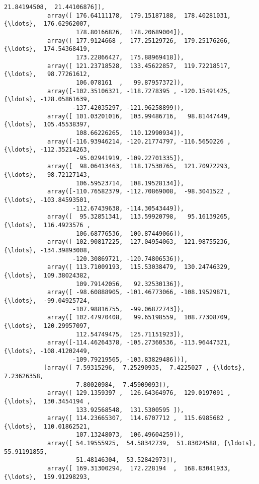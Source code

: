 \documentclass[11pt]{article}
\begin{document}
\begin{Verbatim}[commandchars=\\\{\}]
                    21.84194508,  21.44106876]),
            array([ 176.64111178,  179.15187188,  178.40281031, {\ldots},  176.62962007,
                    178.80166826,  178.20689004]),
            array([ 177.9124668 ,  177.25129726,  179.25176266, {\ldots},  174.54368419,
                    173.22866427,  175.88969418]),
            array([ 121.23718528,  133.45622857,  119.72218517, {\ldots},   98.77261612,
                    106.078161  ,   99.87957372]),
            array([-102.35106321, -118.7278395 , -120.15491425, {\ldots}, -128.05861639,
                   -137.42035297, -121.96258899]),
            array([ 101.03201016,  103.99486716,   98.81447449, {\ldots},  105.45538397,
                    108.66226265,  110.12990934]),
            array([-116.93946214, -120.21774797, -116.5650226 , {\ldots}, -112.35214263,
                    -95.02941919, -109.22701335]),
            array([  98.06413463,  118.17530765,  121.70972293, {\ldots},   98.72127143,
                    106.59523714,  108.19528134]),
            array([-110.76582379, -112.70869008,  -98.3041522 , {\ldots}, -103.84593501,
                   -112.67439638, -114.30543449]),
            array([  95.32851341,  113.59920798,   95.16139265, {\ldots},  116.4923576 ,
                    106.68776536,  100.87449066]),
            array([-102.90817225, -127.04954063, -121.98755236, {\ldots}, -134.39893008,
                   -120.30869721, -120.74806536]),
            array([ 113.71009193,  115.53038479,  130.24746329, {\ldots},  109.38024382,
                    109.79142056,   92.32530136]),
            array([ -98.60888905, -101.46773066, -108.19529871, {\ldots},  -99.04925724,
                   -107.98816755,  -99.06872743]),
            array([ 102.47970408,   99.65198559,  108.77308709, {\ldots},  120.29957097,
                    112.54749475,  125.71151923]),
            array([-114.46264378, -105.27360536, -113.96447321, {\ldots}, -108.41202449,
                   -109.79219565, -103.83829486])],
           [array([ 7.59315296,  7.25290935,  7.4225027 , {\ldots},  7.23626358,
                    7.80020984,  7.45909093]),
            array([ 129.1359397 ,  126.64364976,  129.0197091 , {\ldots},  130.3454194 ,
                    133.92568548,  131.5300595 ]),
            array([ 114.23665307,  114.6707712 ,  115.6985682 , {\ldots},  110.01862521,
                    107.13248073,  106.49604259]),
            array([ 54.19555925,  54.58342739,  51.83024588, {\ldots},  55.91191855,
                    51.48146304,  53.52842973]),
            array([ 169.31300294,  172.228194  ,  168.83041933, {\ldots},  159.91298293,

\end{Verbatim}
\end{document}
